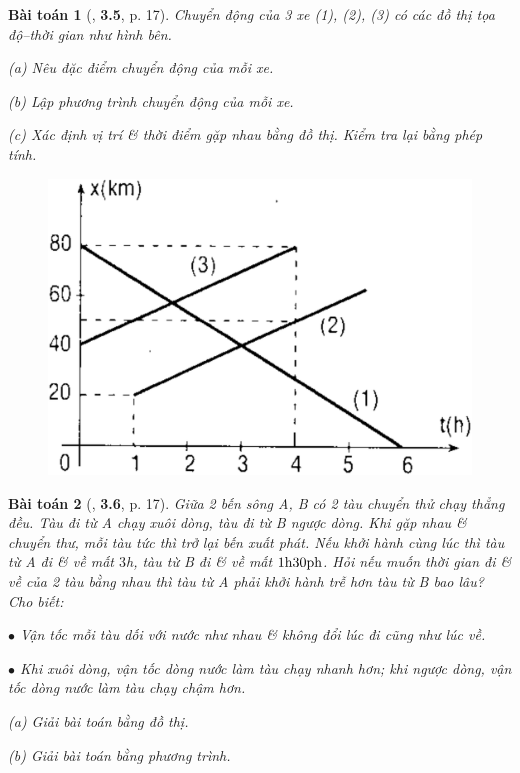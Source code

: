 \documentclass{article}
\numberwithin{equation}{section}
\newtheorem{baitoan}{Bài toán}[section]
\begin{document}
\begin{baitoan}[\cite{Giai_Toan_Vat_Ly_10_tap_1}, \textbf{3.5}, p. 17]
	Chuyển động của 3 xe (1), (2), (3) có các đồ thị tọa độ--thời gian như hình bên.
	\begin{enumerate*}
		\item[(a)] Nêu đặc điểm chuyển động của mỗi xe.
		\item[(b)] Lập phương trình chuyển động của mỗi xe.
		\item[(c)] Xác định vị trí \& thời điểm gặp nhau bằng đồ thị. Kiểm tra lại bằng phép tính.
	\end{enumerate*}

	\begin{figure}[h]
		\centering
		\includegraphics[scale=0.1]{3_5}
	\end{figure}
\end{baitoan}

\begin{baitoan}[\cite{Giai_Toan_Vat_Ly_10_tap_1}, \textbf{3.6}, p. 17]
	Giữa 2 bến sông A, B có 2 tàu chuyển thử chạy thẳng đều. Tàu đi từ A chạy xuôi dòng, tàu đi từ B ngược dòng. Khi gặp nhau \& chuyển thư, mỗi tàu tức thì trở lại bến xuất phát. Nếu khởi hành cùng lúc thì tàu từ A đi \& về mất $3$\emph{h}, tàu từ B đi \& về mất $\rm 1h30ph$. Hỏi nếu muốn thời gian đi \& về của 2 tàu bằng nhau thì tàu từ A phải khởi hành trễ hơn tàu từ B bao lâu? Cho biết:
	\begin{enumerate*}
		\item[$\bullet$] Vận tốc mỗi tàu dối với nước như nhau \& không đổi lúc đi cũng như lúc về.
		\item[$\bullet$] Khi xuôi dòng, vận tốc dòng nước làm tàu chạy nhanh hơn; khi ngược dòng, vận tốc dòng nước làm tàu chạy chậm hơn.
		\item[(a)] Giải bài toán bằng đồ thị.
		\item[(b)] Giải bài toán bằng phương trình.
	\end{enumerate*}
\end{baitoan}
\end{document}
